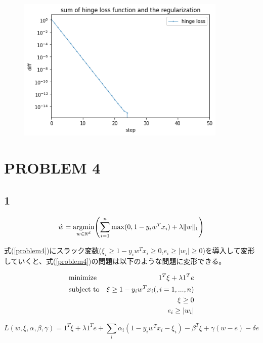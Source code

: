 \documentclass[a4j,11pt]{jarticle}
\newcommand{\argmin}{\mathop{\rm argmin}\limits}
\begin{document}
\begin{figure}
    \centering
    \includegraphics[width=10cm]{p3-3-2.png}
\end{figure}

\newpage
\section{PROBLEM 4}
\subsection*{1}
\begin{equation}
    \hat{w} = \argmin_{w\in \mathbb{R}^d} \Biggl(\sum_{i=1}^{n}\max(0,1-y_iw^Tx_i) + \lambda \|w\|_1 \Biggr) \label{problem4}
\end{equation}

式(\ref{problem4})にスラック変数($\xi_i \geq 1-y_iw^Tx_i \geq 0$,$e_i \geq |w_i| \geq 0$)を導入して変形していくと、式(\ref{problem4})の問題は以下のような問題に変形できる。

\begin{equation}
    \begin{aligned}
        & \text{minimize}
            &  1^T\xi + \lambda 1^Te\\
        &\text{subject to}
            & \xi \geq 1-y_iw^Tx_i \text(,i = 1,...,n)\\
            && \xi \geq 0\\
            && e_i \geq |w_i| 
    \end{aligned}
\end{equation}

\begin{equation*}
    L(w,\xi,\alpha,\beta,\gamma) = 1^T\xi + \lambda 1^Te + \sum_i \alpha_i(1-y_iw^Tx_i-\xi_i) - \beta^T\xi + \gamma(w-e) - \delta e
\end{equation*}
\end{document}
